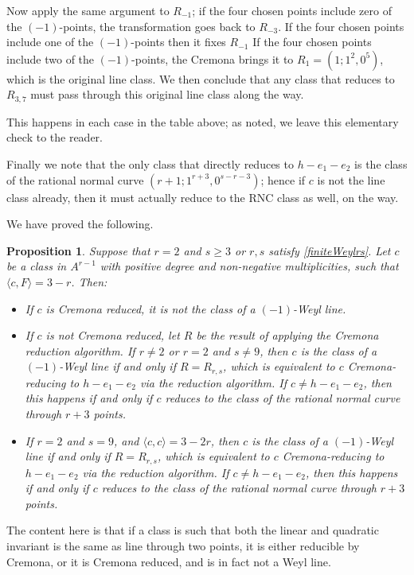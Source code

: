 \documentclass[12pt]{article}
\numberwithin{equation}{section}
\newtheorem{proposition}[equation]{Proposition}
\numberwithin{equation}{section}
\numberwithin{subeq}{equation}
\begin{document}
Now apply the same argument to $R_{-1}$;
if the four chosen points include zero of the $(-1)$-points,
the transformation goes back to $R_{-3}$.
If the four chosen points include one of the $(-1)$-points
then it fixes $R_{-1}$
If the four chosen points include two of the $(-1)$-points,
the Cremona brings it to $R_1 = (1;1^2,0^5)$,
which is the original line class.
We then conclude that any class that reduces to $R_{3,7}$ must pass through this original line class along the way.

This happens in each case in the table above; as noted, we leave this elementary check to the reader.

Finally we note that the only class that directly reduces to $h-e_1-e_2$
is the class of the rational normal curve $(r+1;1^{r+3},0^{s-r-3})$;
hence if $c$ is not the line class already,
then it must actually reduce to the RNC class as well, on the way.

We have proved the following.

\begin{proposition}\label{prop:MDS-1case}
Suppose that $r=2$ and $s \geq 3$
or $r,s$ satisfy \eqref{finiteWeylrs}.
Let $c$ be a class in $A^{r-1}$
with positive degree and non-negative multiplicities,
such that $\langle c, F \rangle = 3-r$.
Then:
\begin{itemize}
\item[(a)] If $c$ is Cremona reduced, it is not the class of a $(-1)$-Weyl line.
\item[(b)] If $c$ is not Cremona reduced, 
let $R$ be the result of applying the Cremona reduction algorithm.  
If $r\neq 2$ or $r =2$ and $s \neq 9$, 
then $c$ is the class of a $(-1)$-Weyl line
if and only if $R=R_{r,s}$,
which is equivalent to $c$ Cremona-reducing to $h-e_1-e_2$
via the reduction algorithm.
If $c \neq h-e_1-e_2$, then this happens
if and only if $c$ reduces to the class of the rational normal curve through $r+3$ points.
\item[(c)] If $r=2$ and $s=9$, and $\langle c, c \rangle =3-2r$,
then $c$ is the class of a $(-1)$-Weyl line
if and only if $R=R_{r,s}$,
which is equivalent to $c$ Cremona-reducing to $h-e_1-e_2$
via the reduction algorithm.
If $c \neq h-e_1-e_2$, then this happens
if and only if $c$ reduces to the class of the rational normal curve through $r+3$ points.
\end{itemize}
\end{proposition}


The content here is that if a class is such that both the linear and quadratic invariant
is the same as line through two points, it is either reducible by Cremona,
or it is Cremona reduced, and is in fact not a Weyl line.
\end{document}
